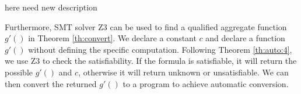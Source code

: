 here need new description


Furthermore, SMT solver Z3 can be used to find a qualified aggregate function $g'()$ in Theorem \ref{th:convert}. We declare a constant $c$ and declare a function $g'()$ without defining the specific computation. Following Theorem \ref{th:auto:4}, we use Z3 to check the satisfiability. If the formula is satisfiable, it will return the possible $g'()$ and $c$, otherwise it will return unknown or unsatisfiable. We can then convert the returned $g'()$ to a program to achieve automatic conversion.
